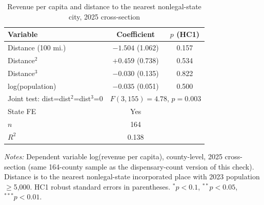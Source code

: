 \begin{table}[htbp]
\centering
\caption{Revenue per capita and distance to the nearest nonlegal-state city, 2025 cross-section}
\label{tab:city_distance_revpc}
\small
\begin{tabular}{lcc}
\toprule
Variable & Coefficient & $p$ (HC1) \\
\midrule
Distance (100 mi.) & $-1.504$ (1.062) & 0.157 \\
Distance$^2$ & $+0.459$ (0.738) & 0.534 \\
Distance$^3$ & $-0.030$ (0.135) & 0.822 \\
log(population) & $-0.035$ (0.051) & 0.500 \\
\midrule
Joint test: dist=dist$^2$=dist$^3$=0 & \multicolumn{2}{c}{$F(3,155)=4.78$, $p=0.003$} \\
State FE & Yes & \\
$n$ & 164 & \\
$R^2$ & 0.138 & \\
\bottomrule
\end{tabular}
\begin{minipage}{0.85\textwidth}
\vspace{0.3em}
\footnotesize
\textit{Notes:} Dependent variable log(revenue per capita), county-level, 2025 cross-section (same 164-county
sample as the dispensary-count version of this check). Distance is to the nearest nonlegal-state incorporated
place with 2023 population $\geq$5,000. HC1 robust standard errors in parentheses.
$^{*}p<0.1$, $^{**}p<0.05$, $^{***}p<0.01$.
\end{minipage}
\end{table}
